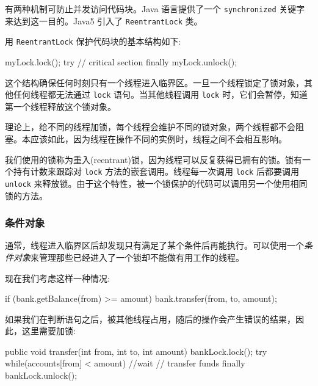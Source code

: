 有两种机制可防止并发访问代码块。Java 语言提供了一个 \texttt{synchronized} 关键字来达到这一目的。Java5 引入了 \texttt{ReentrantLock} 类。

用 \texttt{ReentrantLock} 保护代码块的基本结构如下:
\begin{Java}
myLock.lock();
try {
    // critical section
} finally {
    myLock.unlock();
}
\end{Java}

这个结构确保任何时刻只有一个线程进入临界区。一旦一个线程锁定了锁对象，其他任何线程都无法通过 \texttt{lock} 语句。当其他线程调用 \texttt{lock} 时，它们会暂停，知道第一个线程释放这个锁对象。


理论上，给不同的线程加锁，每个线程会维护不同的锁对象，两个线程都不会阻塞。本应该如此，因为线程在操作不同的实例时，线程之间不会相互影响。

我们使用的锁称为重入(reentrant)锁，因为线程可以反复获得已拥有的锁。锁有一个持有计数来跟踪对 \texttt{lock} 方法的嵌套调用。线程每一次调用 \texttt{lock} 后都要调用 \texttt{unlock} 来释放锁。由于这个特性，被一个锁保护的代码可以调用另一个使用相同锁的方法。

\subsubsection{条件对象}

通常，线程进入临界区后却发现只有满足了某个条件后再能执行。可以使用一个\textit{条件对象}来管理那些已经进入了一个锁却不能做有用工作的线程。

现在我们考虑这样一种情况:
\begin{Java}
if (bank.getBalance(from) >= amount)
    bank.transfer(from, to, amount);
\end{Java}

如果我们在判断语句之后，被其他线程占用，随后的操作会产生错误的结果，因此，这里需要加锁:
\begin{Java}
public void transfer(int from, int to, int amount) {
    bankLock.lock();
    try {
        while(accounts[from] < amount) {
            //wait
        }
        // transfer funds
    } finally {
        bankLock.unlock();
    }
}
\end{Java}

